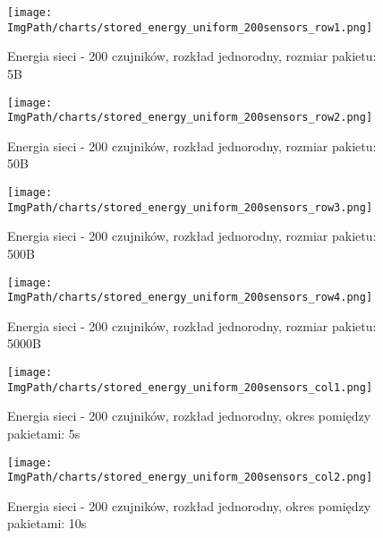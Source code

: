 \documentclass[a4paper,12pt,twoside,openany]{report}
\newcommand{\ImgPath}{./img}
\begin{document}
\begin{figure}[H]
	\begin{center}
		\texttt{[image: \\ImgPath/charts/stored\_energy\_uniform\_200sensors\_row1.png]}
	\end{center}
	\caption{Energia sieci - 200 czujników, rozkład jednorodny, rozmiar pakietu: 5B}
\end{figure}

\begin{figure}[H]
	\begin{center}
		\texttt{[image: \\ImgPath/charts/stored\_energy\_uniform\_200sensors\_row2.png]}
	\end{center}
	\caption{Energia sieci - 200 czujników, rozkład jednorodny, rozmiar pakietu: 50B}
\end{figure}

\begin{figure}[H]
	\begin{center}
		\texttt{[image: \\ImgPath/charts/stored\_energy\_uniform\_200sensors\_row3.png]}
	\end{center}
	\caption{Energia sieci - 200 czujników, rozkład jednorodny, rozmiar pakietu: 500B}
\end{figure}

\begin{figure}[H]
	\begin{center}
		\texttt{[image: \\ImgPath/charts/stored\_energy\_uniform\_200sensors\_row4.png]}
	\end{center}
	\caption{Energia sieci - 200 czujników, rozkład jednorodny, rozmiar pakietu: 5000B}
\end{figure}

\begin{figure}[H]
	\begin{center}
		\texttt{[image: \\ImgPath/charts/stored\_energy\_uniform\_200sensors\_col1.png]}
	\end{center}
	\caption{Energia sieci - 200 czujników, rozkład jednorodny, okres pomiędzy pakietami: 5s}
\end{figure}

\begin{figure}[H]
	\begin{center}
		\texttt{[image: \\ImgPath/charts/stored\_energy\_uniform\_200sensors\_col2.png]}
	\end{center}
	\caption{Energia sieci - 200 czujników, rozkład jednorodny, okres pomiędzy pakietami: 10s}
\end{figure}
\end{document}
